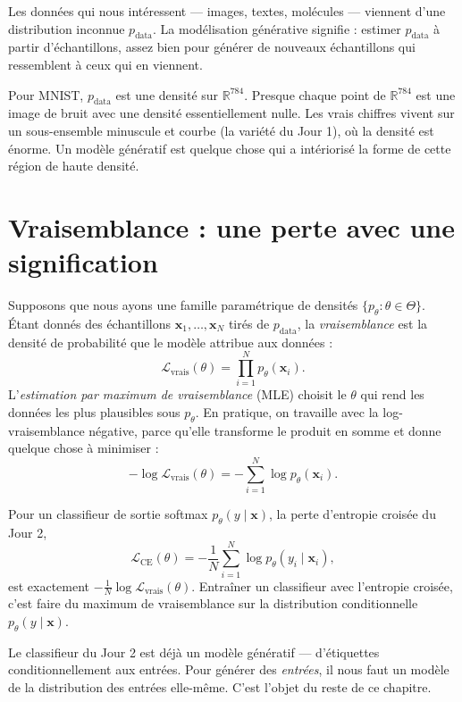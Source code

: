 Les données qui nous intéressent --- images, textes, molécules --- viennent d'une distribution inconnue $p_{\text{data}}$. La modélisation générative signifie : estimer $p_{\text{data}}$ à partir d'échantillons, assez bien pour générer de nouveaux échantillons qui ressemblent à ceux qui en viennent.

\begin{intuition}
Pour MNIST, $p_{\text{data}}$ est une densité sur $\mathbb{R}^{784}$. Presque chaque point de $\mathbb{R}^{784}$ est une image de bruit avec une densité essentiellement nulle. Les vrais chiffres vivent sur un sous-ensemble minuscule et courbe (la variété du Jour 1), où la densité est énorme. Un modèle génératif est quelque chose qui a intériorisé la forme de cette région de haute densité.
\end{intuition}

\section{Vraisemblance : une perte avec une signification}

Supposons que nous ayons une famille paramétrique de densités $\{p_\theta : \theta \in \Theta\}$. Étant donnés des échantillons $\bm{x}_1, \ldots, \bm{x}_N$ tirés de $p_{\text{data}}$, la \emph{vraisemblance} est la densité de probabilité que le modèle attribue aux données :
\[
\mathcal{L}_{\text{vrais}}(\theta) = \prod_{i=1}^N p_\theta(\bm{x}_i).
\]
L'\emph{estimation par maximum de vraisemblance} (MLE) choisit le $\theta$ qui rend les données les plus plausibles sous $p_\theta$. En pratique, on travaille avec la log-vraisemblance négative, parce qu'elle transforme le produit en somme et donne quelque chose à minimiser :
\[
- \log \mathcal{L}_{\text{vrais}}(\theta) = - \sum_{i=1}^N \log p_\theta(\bm{x}_i).
\]

\begin{proposition}
Pour un classifieur de sortie softmax $p_\theta(y \mid \bm{x})$, la perte d'entropie croisée du Jour 2,
\[
\mathcal{L}_{\text{CE}}(\theta) = - \frac{1}{N} \sum_{i=1}^N \log p_\theta(y_i \mid \bm{x}_i),
\]
est exactement $-\frac{1}{N} \log \mathcal{L}_{\text{vrais}}(\theta)$. Entraîner un classifieur avec l'entropie croisée, c'est faire du maximum de vraisemblance sur la distribution conditionnelle $p_\theta(y \mid \bm{x})$.
\end{proposition}

Le classifieur du Jour 2 est déjà un modèle génératif --- d'étiquettes conditionnellement aux entrées. Pour générer des \emph{entrées}, il nous faut un modèle de la distribution des entrées elle-même. C'est l'objet du reste de ce chapitre.

